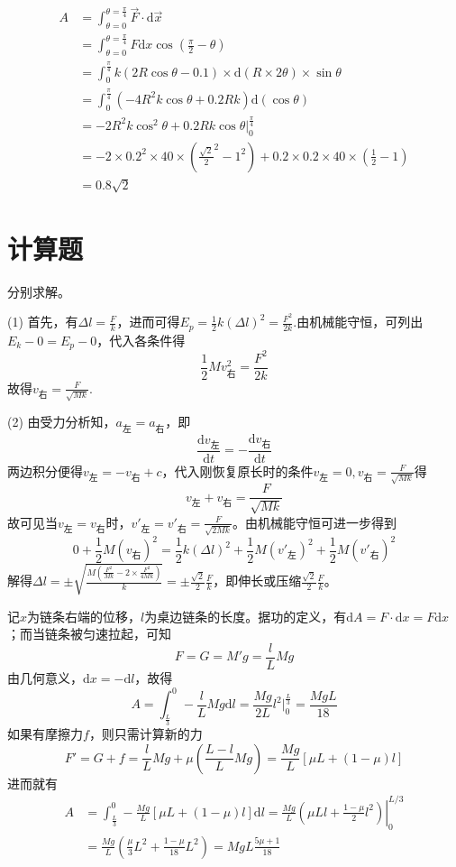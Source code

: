 \documentclass[b5paper,opensource,sourcefont,parskip]{qyxf-book}
\newcommand{\di}[1]{\mathrm{d}#1}
\newcommand{\dy}[2]{\frac{\di{#1}}{\di{#2}}}
\begin{document}
\begin{align*}
A&=\int_{\theta=0}^{\theta=\frac{\pi}{4}}{\vec{F}}\cdot\di{\vec{x}}\\
&=\int_{\theta=0}^{\theta=\frac{\pi}{4}}F\di{x}\cos\left(\frac{\pi}{2}-\theta\right)\\
&=\int_{0}^{\frac{\pi}{4}}k(2R\cos\theta-0.1)\times\di{(R\times 2\theta)}\times\sin\theta\\
&=\int_{0}^{\frac{\pi}{4}}(-4R^2k\cos\theta+0.2Rk)\di{(\cos\theta)}\\
&=-2R^2k\cos^2\theta+0.2Rk\cos\theta\left.\right|_0^{\frac{\pi}{4}}\\
&=-2\times 0.2^2\times 40\times({\frac{\sqrt{2}}{2}}^2-1^2)+0.2\times 0.2\times 40\times(\frac{1}{2}-1)\\
&=0.8\sqrt{2}
\end{align*}


\section{计算题}

\solve 分别求解。

(1) 首先，有$\Delta l=\frac{F}{k}$，进而可得$E_p=\frac{1}{2}k(\Delta l)^2=\frac{F^2}{2k}$.由机械能守恒，可列出
$E_k-0=E_p-0$，代入各条件得
\[\frac{1}{2}Mv_{\text{右}}^2=\frac{F^2}{2k}\]
故得$v_{\text{右}}=\frac{F}{\sqrt{Mk}}$.

(2) 由受力分析知，$a_{\text{左}}=a_{\text{右}}$，即
\[\dy{v_{\text{左}}}{t}=-\dy{v_{\text{右}}}{t}\]
两边积分便得$v_{\text{左}}=-v_{\text{右}}+c$，代入刚恢复原长时的条件$v_{\text{左}}=0,v_{\text{右}}=\frac{F}{\sqrt{Mk}}$得
\[v_{\text{左}}+v_{\text{右}}=\frac{F}{\sqrt{Mk}}\]
故可见当$v_{\text{左}}=v_{\text{右}}$时，$v'_{\text{左}}=v'_{\text{右}}=\frac{F}{\sqrt{2Mk}}$。由机械能守恒可进一步得到
\[0+\frac{1}{2}M(v_{\text{右}})^2=\frac{1}{2}k(\Delta l)^2+\frac{1}{2}M(v'_{\text{左}})^2+\frac{1}{2}M(v'_{\text{右}})^2\]
解得$\Delta l=\pm\sqrt{\frac{M\left(\frac{F^2}{Mk}-2\times\frac{F^2}{4Mk}\right)}{k}}=\pm\frac{\sqrt{2}}{2}\frac{F}{k}$，即伸长或压缩$\frac{\sqrt{2}}{2}\frac{F}{k}$。


\solve 记$x$为链条右端的位移，$l$为桌边链条的长度。据功的定义，有$\di{A}=F\cdot\di{x}=F\di{x}$；而当链条被匀速拉起，可知
\[F=G=M'g=\frac{l}{L}Mg\]
由几何意义，$\di{x}=-\di{l}$，故得
\[
A=\int_{\frac{L}{3}}^{0} -\frac{l}{L}Mg\di{l}
=\frac{Mg}{2L}l^2\left.\right|_{0}^{\frac{L}{3}}
=\frac{MgL}{18}
\]
如果有摩擦力$f$，则只需计算新的力
\[
F'=G+f=\frac{l}{L}Mg+\mu\left(\frac{L-l}{L}Mg\right)=\frac{Mg}{L}[\mu L+(1-\mu)l]
\]
进而就有
\begin{align*}
A&=\int_{\frac{L}{3}}^{0} -\frac{Mg}{L}[\mu L+(1-\mu)l] \di{l}=\frac{Mg}{L}\left.\left(\mu Ll+\frac{1-\mu}{2}l^2\right)\right|_{0}^{L/3}\\
&=\frac{Mg}{L}\left(\frac{\mu}{3}L^2+\frac{1-\mu}{18}L^2\right)=MgL\frac{5\mu +1}{18}
\end{align*}
\end{document}
